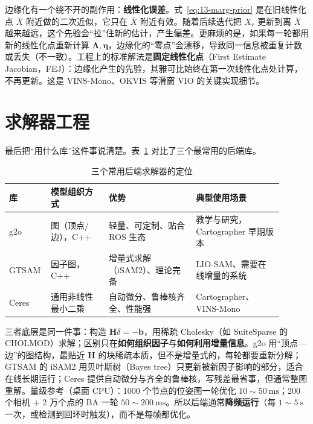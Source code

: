 边缘化有一个绕不开的副作用：\textbf{线性化误差}。式~\eqref{eq:13-marg-prior} 是在旧线性化点 $\bar{X}$ 附近做的二次近似，它只在 $\bar{X}$ 附近有效。随着后续迭代把 $X_r$ 更新到离 $\bar{X}$ 越来越远，这个先验会``拉''住新的估计，产生偏差。更麻烦的是，如果每一轮都用新的线性化点重新计算 $\bm{\Lambda},\bm{\eta}$，边缘化的``零点''会漂移，导致同一信息被重复计数或丢失（不一致）。工程上的标准解法是\textbf{固定线性化点}（First Estimate Jacobian，FEJ）：边缘化产生的先验，其雅可比始终在第一次线性化点处计算，不再更新。这是 VINS-Mono\cite{qin2018vinsmono}、OKVIS 等滑窗 VIO 的关键实现细节。

\section{求解器工程}\label{sec:13-solver}

最后把``用什么库''这件事说清楚。表~\ref{tab:13-solver} 对比了三个最常用的后端库。

\begin{table}[htbp]
  \centering
  \caption{三个常用后端求解器的定位}\label{tab:13-solver}
  \footnotesize
  \begin{tabular}{p{0.10\linewidth}p{0.20\linewidth}p{0.30\linewidth}p{0.30\linewidth}}
    \toprule
    库 & 模型组织方式 & 优势 & 典型使用场景 \\
    \midrule
    g2o & 图（顶点/边），C++ & 轻量、可定制、贴合 ROS 生态 & 教学与研究，Cartographer 早期版本 \\
    GTSAM & 因子图，C++ & 增量式求解（iSAM2）、理论完备 & LIO-SAM、需要在线增量的系统 \\
    Ceres & 通用非线性最小二乘 & 自动微分、鲁棒核齐全、性能强 & Cartographer、VINS-Mono \\
    \bottomrule
  \end{tabular}
\end{table}

三者底层是同一件事：构造 $\bm{H}\delta=-\bm{b}$，用稀疏 Cholesky（如 SuiteSparse 的 CHOLMOD）求解；区别只在\textbf{如何组织因子}与\textbf{如何利用增量信息}。g2o 用``顶点—边''的图结构，最贴近 $\bm{H}$ 的块稀疏本质，但不是增量式的，每轮都要重新分解；GTSAM 的 iSAM2 用贝叶斯树（Bayes tree）只更新被新因子影响的部分，适合在线长期运行；Ceres 提供自动微分与齐全的鲁棒核，写残差最省事，但通常整图重解。量级参考（桌面 CPU）：1000 个节点的位姿图一轮优化 $10\sim50\ \mathrm{ms}$；200 个相机 $+$ 2 万个点的 BA 一轮 $50\sim200\ \mathrm{ms}$。所以后端通常\textbf{降频运行}（每 $1\sim5\ \mathrm{s}$ 一次，或检测到回环时触发），而不是每帧都优化。

